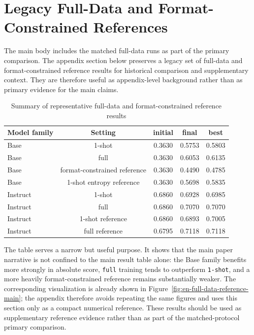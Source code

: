 \documentclass[12pt,a4paper]{ctexart}
\begin{document}
\clearpage
\appendix

\section{Legacy Full-Data and Format-Constrained References}

The main body includes the matched full-data runs as part of the primary comparison. The appendix section below preserves a legacy set of full-data and format-constrained reference results for historical comparison and supplementary context. They are therefore useful as appendix-level background rather than as primary evidence for the main claims.

\begin{table}[H]
    \centering
    \caption{Summary of representative full-data and format-constrained reference results}
    \label{tab:en-full-data-reference-runs}
    \small
    \begin{tabular}{lcccc}
        \toprule
        Model family & Setting & initial & final & best \\
        \midrule
        Base & 1-shot & 0.3630 & 0.5753 & 0.5803 \\
        Base & full & 0.3630 & 0.6053 & 0.6135 \\
        Base & format-constrained reference & 0.3630 & 0.4490 & 0.4785 \\
        Base & 1-shot entropy reference & 0.3630 & 0.5698 & 0.5835 \\
        Instruct & 1-shot & 0.6860 & 0.6928 & 0.6985 \\
        Instruct & full & 0.6860 & 0.7070 & 0.7070 \\
        Instruct & 1-shot reference & 0.6860 & 0.6893 & 0.7005 \\
        Instruct & full reference & 0.6795 & 0.7118 & 0.7118 \\
        \bottomrule
    \end{tabular}
\end{table}

The table serves a narrow but useful purpose. It shows that the main paper narrative is not confined to the main result table alone: the Base family benefits more strongly in absolute score, \texttt{full} training tends to outperform \texttt{1-shot}, and a more heavily format-constrained reference remains substantially weaker. The corresponding visualization is already shown in Figure~\ref{fig:en-full-data-reference-main}; the appendix therefore avoids repeating the same figures and uses this section only as a compact numerical reference. These results should be used as supplementary reference evidence rather than as part of the matched-protocol primary comparison.
\end{document}
